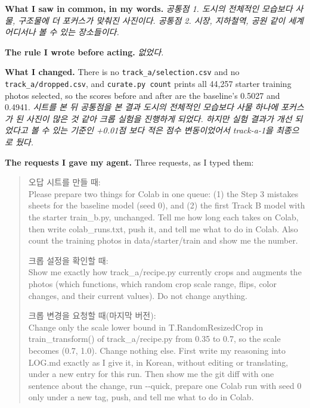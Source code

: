 \documentclass[11pt]{article}
\begin{document}
\textbf{What I saw in common, in my words.}
\emph{공통점 1. 도시의 전체적인 모습보다 사물, 구조물에 더 포커스가 맞춰진
사진이다. 공통점 2. 시장, 지하철역, 공원 같이 세계 어디서나 볼 수 있는
장소들이다.}

\textbf{The rule I wrote before acting.} \emph{없었다.}

\textbf{What I changed.} There is no \texttt{track\_a/selection.csv} and no
\texttt{track\_a/dropped.csv}, and \texttt{curate.py count} prints all 44{,}257
starter training photos selected, so the scores before and after are the
baseline's 0.5027 and 0.4941. \emph{시트를 본 뒤 공통점을 본 결과 도시의 전체적인
모습보다 사물 하나에 포커스가 된 사진이 많은 것 같아 크롭 실험을 진행하게
되었다. 하지만 실험 결과가 개선 되었다고 볼 수 있는 기준인 +0.01점 보다 적은
점수 변동이었어서 track-a-1을 최종으로 뒀다.}

\textbf{The requests I gave my agent.} Three requests, as I typed them:

\begin{quote}
\noindent 오답 시트를 만들 때:\\
Please prepare two things for Colab in one queue: (1) the Step 3 mistakes
sheets for the baseline model (seed 0), and (2) the first Track B model with
the starter train\_b.py, unchanged. Tell me how long each takes on Colab, then
write colab\_runs.txt, push it, and tell me what to do in Colab. Also count the
training photos in data/starter/train and show me the number.

\noindent 크롭 설정을 확인할 때:\\
Show me exactly how track\_a/recipe.py currently crops and augments the photos
(which functions, which random crop scale range, flips, color changes, and
their current values). Do not change anything.

\noindent 크롭 변경을 요청할 때(마지막 버전):\\
Change only the scale lower bound in T.RandomResizedCrop in train\_transform()
of track\_a/recipe.py from 0.35 to 0.7, so the scale becomes (0.7, 1.0). Change
nothing else. First write my reasoning into LOG.md exactly as I give it, in
Korean, without editing or translating, under a new entry for this run. Then
show me the git diff with one sentence about the change, run -{}-quick, prepare
one Colab run with seed 0 only under a new tag, push, and tell me what to do in
Colab.
\end{quote}


\end{document}
